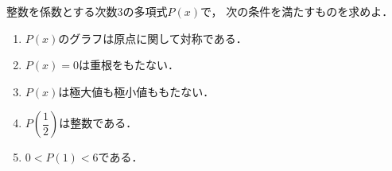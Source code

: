 \documentclass[../../main.tex]{subfiles}
\begin{document}
整数を係数とする次数3の多項式$P(x)$で，
次の条件を満たすものを求めよ．
\begin{enumerate}
  \item $P(x)$のグラフは原点に関して対称である．
  \item $P(x)=0$は重根をもたない．
  \item $P(x)$は極大値も極小値ももたない．
  \item $\displaystyle P \left( \dfrac{1}{2} \right)$は整数である．
  \item $0<P(1)<6$である．
\end{enumerate}
\end{document}
